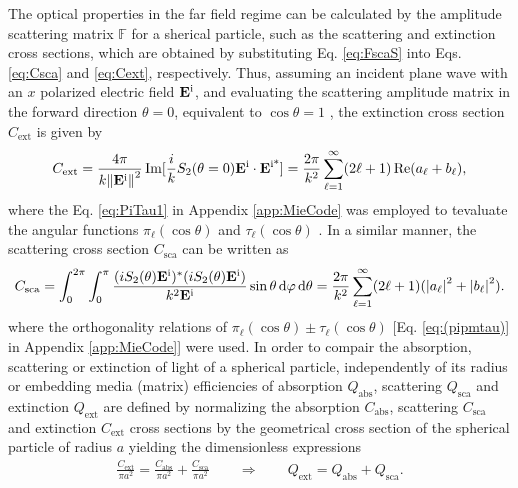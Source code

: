 
The optical properties in the far field regime can be calculated by the amplitude scattering matrix $\mathbb{F}$  for a sherical particle, such as the scattering and extinction cross sections, which are obtained by substituting Eq. \eqref{eq:FscaS} into Eqs. \eqref{eq:Csca} and \eqref{eq:Cext}, respectively. Thus, assuming an incident plane wave with an $x$ polarized electric field $\vb{E}^\text{i}$, and evaluating the scattering amplitude matrix in the forward direction $\theta = 0$, equivalent to $\cos\theta = 1$ , the extinction cross section $C_\text{ext}$ is given by
%
\begin{align}
	C_\text{ext} = \frac{4\pi}{k \norm{\vb{E}^\text{i}}^2}\Im[\frac{i}{k}S_2(\theta = 0)\vb{E}^\text{i}\cdot\vb{E}^\text{i*}]
	  			 = \frac{2 \pi}{k^2}\sum_{\ell = 1}^\infty (2 \ell + 1) \Re(a_\ell + b_\ell),
	\label{eq:CextSphere}
\end{align}
where the Eq. \eqref{eq:PiTau1} in Appendix \ref{app:MieCode} was employed to tevaluate the angular functions $\pi_\ell(\cos\theta)$ and $\tau_\ell(\cos\theta)$ . In a similar manner, the scattering cross section $C_\text{sca}$  can be written as
%
\begin{align}
C_\text{sca} = \int_0^{2\pi}\int_0^\pi  \frac{(iS_2(\theta)\vb{E}^\text{i})^*(iS_2(\theta)\vb{E}^\text{i})}{k^2\vb{E}^\text{i}} \sin\theta\dd{\varphi}\dd{\theta}
			 = \frac{2 \pi}{k^2}\sum_{\ell = 1}^\infty (2 \ell + 1) (\abs{a_\ell}^2 + \abs{b_\ell}^2).
	\label{eq:CscaSphere}
\end{align}
%
where the orthogonality relations of $\pi_\ell(\cos\theta)\pm\tau_\ell(\cos\theta)$ [Eq. \eqref{eq:(pipmtau)} in Appendix \ref{app:MieCode}] were used. In order to compair the absorption, scattering or extinction of light of a spherical particle, independently of its radius or embedding media (matrix) efficiencies of  absorption $Q_\text{abs}$, scattering $Q_\text{sca}$ and extinction $Q_\text{ext}$ are defined by normalizing the   absorption $C_\text{abs}$, scattering $C_\text{sca}$ and extinction $C_\text{ext}$ cross sections by the geometrical cross section of the spherical particle of radius $a$ yielding the dimensionless expressions
%
\begin{align}
 	\frac{C_\text{ext}}{\pi a^2} =   \frac{C_\text{abs}}{\pi a^2}  + \frac{C_\text{sca}}{\pi a^2}
 		\qquad \Longrightarrow \qquad
	Q_\text{ext} =    Q_\text{abs}  +  Q_\text{sca}.
	\label{eq:Efficiencies}
\end{align}
%

